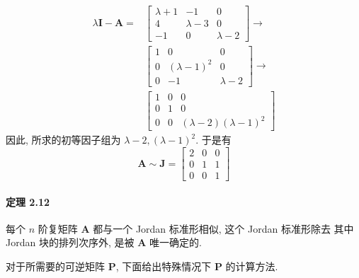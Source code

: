 \begin{align*}
    \lambda\bm{I} - \bm{A} = & \begin{bmatrix}
                                   \lambda + 1 & -1          & 0           \\
                                   4           & \lambda - 3 & 0           \\
                                   -1          & 0           & \lambda - 2
                               \end{bmatrix} \to \\
                             & \begin{bmatrix}
                                   1 & 0               & 0           \\
                                   0 & (\lambda - 1)^2 & 0           \\
                                   0 & -1              & \lambda - 2
                               \end{bmatrix} \to       \\
                             & \begin{bmatrix}
                                   1 & 0 & 0                            \\
                                   0 & 1 & 0                            \\
                                   0 & 0 & (\lambda - 2)(\lambda - 1)^2
                               \end{bmatrix}
\end{align*}
因此, 所求的初等因子组为 $\lambda - 2, (\lambda - 1)^2$. 于是有
$$
    \bm{A} \sim \bm{J} = \begin{bmatrix}
        2 & 0 & 0 \\
        0 & 1 & 1 \\
        0 & 0 & 1
    \end{bmatrix}
$$

\paragraph*{定理 2.12} 每个 $n$ 阶复矩阵 $\bm{A}$ 都与一个 Jordan 标准形相似, 这个 Jordan 标准形除去
其中 Jordan 块的排列次序外, 是被 $\bm{A}$ 唯一确定的.

\par 对于所需要的可逆矩阵 $\bm{P}$, 下面给出特殊情况下 $\bm{P}$ 的计算方法.

